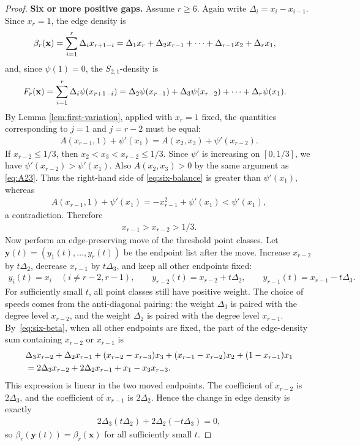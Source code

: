 \documentclass[10pt,a4paper]{article}
\begin{document}
\begin{proof}
\medskip
\noindent\textbf{Six or more positive gaps.}
Assume $r\ge6$.  Again write $\Delta_i=x_i-x_{i-1}$.  Since $x_r=1$, the edge density is
\begin{align}\label{eq:six-beta}
  \beta_r({\bf x})
  &=\sum_{i=1}^r\Delta_i x_{r+1-i}=\Delta_1x_r+\Delta_2x_{r-1}+\cdots+\Delta_{r-1}x_2+\Delta_rx_1,
\end{align}
and, since $\psi(1)=0$, the $S_{2,1}$-density is
\begin{align}\label{eq:six-F}
  F_r({\bf x})
  &=\sum_{i=1}^r\Delta_i\psi(x_{r+1-i})=\Delta_2\psi(x_{r-1})+\Delta_3\psi(x_{r-2})+\cdots+\Delta_r\psi(x_1).
\end{align}
By Lemma \ref{lem:first-variation}, applied with $x_r=1$ fixed, the quantities corresponding to $j=1$ and $j=r-2$ must be equal:
\begin{align}\label{eq:six-balance}
  A(x_{r-1},1)+\psi'(x_1)=A(x_2,x_3)+\psi'(x_{r-2}).
\end{align}
If $x_{r-2}\le1/3$, then $x_2<x_3<x_{r-2}\le1/3$.  Since $\psi'$ is increasing on $[0,1/3]$, we have $\psi'(x_{r-2})>\psi'(x_1)$.  Also $A(x_2,x_3)>0$ by the same argument as \eqref{eq:A23}.  Thus the right-hand side of \eqref{eq:six-balance} is greater than $\psi'(x_1)$, whereas
\begin{align*}
  A(x_{r-1},1)+\psi'(x_1)=-x_{r-1}^2+\psi'(x_1)<\psi'(x_1),
\end{align*}
a contradiction.  Therefore
\begin{align}\label{eq:high-levels}
  x_{r-1}>x_{r-2}>1/3.
\end{align}
Now perform an edge-preserving move of the threshold point classes.  Let $\mathbf{y}(t)=(y_1(t),\ldots,y_r(t))$ be the endpoint list after the move.  Increase $x_{r-2}$ by $t\Delta_2$, decrease $x_{r-1}$ by $t\Delta_3$, and keep all other endpoints fixed:
\begin{align*}
  y_i(t)=x_i\quad(i\ne r-2,r-1),
  \qquad
  y_{r-2}(t)=x_{r-2}+t\Delta_2,
  \qquad
  y_{r-1}(t)=x_{r-1}-t\Delta_3.
\end{align*}
For sufficiently small $t$, all point classes still have positive weight.  The choice of speeds comes from the anti-diagonal pairing: the weight $\Delta_3$ is paired with the degree level $x_{r-2}$, and the weight $\Delta_2$ is paired with the degree level $x_{r-1}$.  By~\eqref{eq:six-beta}, when all other endpoints are fixed, the part of the edge-density sum containing $x_{r-2}$ or $x_{r-1}$ is
\begin{align}\label{eq:rge6-edge-part}
  &\Delta_3x_{r-2}+\Delta_2x_{r-1}+(x_{r-2}-x_{r-3})x_3+(x_{r-1}-x_{r-2})x_2+(1-x_{r-1})x_1\notag\\
  &=2\Delta_3x_{r-2}+2\Delta_2x_{r-1}+x_1-x_3x_{r-3}.
\end{align}
This expression is linear in the two moved endpoints.  The coefficient of $x_{r-2}$ is $2\Delta_3$, and the coefficient of $x_{r-1}$ is $2\Delta_2$.
Hence the change in edge density is exactly
\begin{align*}
  2\Delta_3(t\Delta_2)+2\Delta_2(-t\Delta_3)=0,
\end{align*}
so $\beta_r(\mathbf{y}(t))=\beta_r(\mathbf{x})$ for all sufficiently small $t$.


\end{proof}
\end{document}
